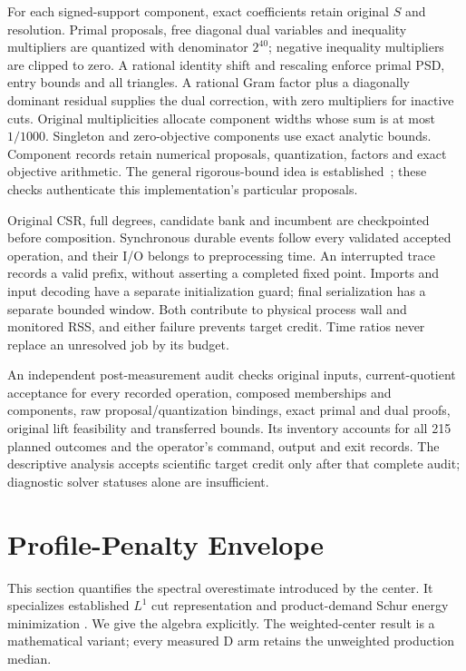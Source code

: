 \documentclass[sigconf,anonymous,review]{acmart}
\newcommand{\1}{\mathbf{1}}
\begin{document}
For each signed-support component, exact coefficients retain original $S$
and resolution. Primal proposals, free diagonal dual variables and inequality
multipliers are quantized with denominator $2^{40}$; negative inequality
multipliers are clipped to zero. A rational identity shift and rescaling enforce primal
PSD, entry bounds and all triangles. A rational Gram factor plus a diagonally
dominant residual supplies the dual correction, with zero multipliers for
inactive cuts. Original multiplicities allocate component widths whose sum
is at most $1/1000$. Singleton and zero-objective components use exact
analytic bounds. Component records retain numerical proposals, quantization,
factors and exact objective arithmetic. The general rigorous-bound idea is
established~\cite{jansson2008rigorous}; these checks authenticate this
implementation's particular proposals.

Original CSR, full degrees, candidate bank and incumbent are checkpointed
before composition. Synchronous durable events follow every validated
accepted operation, and their I/O belongs to preprocessing time. An interrupted
trace records a valid prefix, without asserting a completed fixed point.
Imports and input decoding have a separate initialization guard; final
serialization has a separate bounded window. Both contribute to physical
process wall and monitored RSS, and either failure prevents target credit.
Time ratios never replace an unresolved job by its budget.

An independent post-measurement audit checks original inputs, current-quotient
acceptance for every recorded operation, composed memberships and components,
raw proposal/quantization bindings, exact primal and dual proofs, original
lift feasibility and transferred bounds. Its inventory accounts for all
215 planned outcomes and the operator's command, output and exit records.
The descriptive analysis accepts scientific target credit only after that
complete audit; diagnostic solver statuses alone are insufficient.

\section{Profile-Penalty Envelope}\label{app:profile-envelope}
This section quantifies the spectral overestimate introduced by the center.
It specializes established $L^1$ cut representation
\cite{avis1991cutcone} and product-demand Schur energy minimization
\cite[Definitions G.13--G.14 and the proof of Lemma C.2]{kyng2015connection}.
We give the algebra explicitly. The weighted-center result is a mathematical
variant; every measured D arm retains the unweighted production median.
\end{document}
